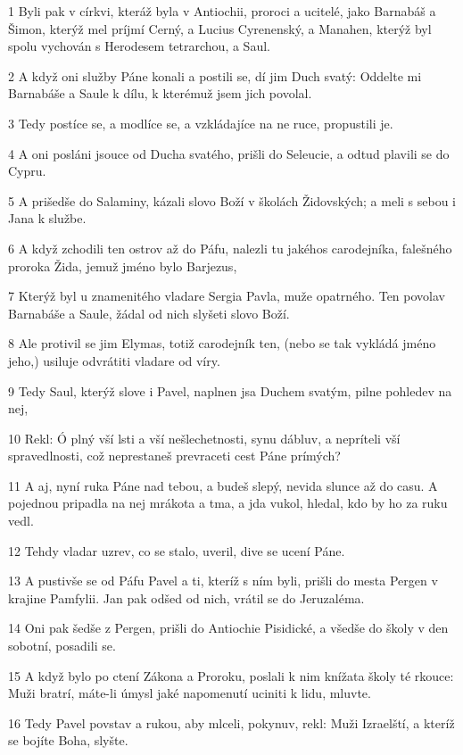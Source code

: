\par 1 Byli pak v církvi, kteráž byla v Antiochii, proroci a ucitelé, jako Barnabáš a Šimon, kterýž mel príjmí Cerný, a Lucius Cyrenenský, a Manahen, kterýž byl spolu vychován s Herodesem tetrarchou, a Saul.
\par 2 A když oni služby Páne konali a postili se, dí jim Duch svatý: Oddelte mi Barnabáše a Saule k dílu, k kterémuž jsem jich povolal.
\par 3 Tedy postíce se, a modlíce se, a vzkládajíce na ne ruce, propustili je.
\par 4 A oni posláni jsouce od Ducha svatého, prišli do Seleucie, a odtud plavili se do Cypru.
\par 5 A prišedše do Salaminy, kázali slovo Boží v školách Židovských; a meli s sebou i Jana k službe.
\par 6 A když zchodili ten ostrov až do Páfu, nalezli tu jakéhos carodejníka, falešného proroka Žida, jemuž jméno bylo Barjezus,
\par 7 Kterýž byl u znamenitého vladare Sergia Pavla, muže opatrného. Ten povolav Barnabáše a Saule, žádal od nich slyšeti slovo Boží.
\par 8 Ale protivil se jim Elymas, totiž carodejník ten, (nebo se tak vykládá jméno jeho,) usiluje odvrátiti vladare od víry.
\par 9 Tedy Saul, kterýž slove i Pavel, naplnen jsa Duchem svatým, pilne pohledev na nej,
\par 10 Rekl: Ó plný vší lsti a vší nešlechetnosti, synu dábluv, a nepríteli vší spravedlnosti, což neprestaneš prevraceti cest Páne prímých?
\par 11 A aj, nyní ruka Páne nad tebou, a budeš slepý, nevida slunce až do casu. A pojednou pripadla na nej mrákota a tma, a jda vukol, hledal, kdo by ho za ruku vedl.
\par 12 Tehdy vladar uzrev, co se stalo, uveril, dive se ucení Páne.
\par 13 A pustivše se od Páfu Pavel a ti, kteríž s ním byli, prišli do mesta Pergen v krajine Pamfylii. Jan pak odšed od nich, vrátil se do Jeruzaléma.
\par 14 Oni pak šedše z Pergen, prišli do Antiochie Pisidické, a všedše do školy v den sobotní, posadili se.
\par 15 A když bylo po ctení Zákona a Proroku, poslali k nim knížata školy té rkouce: Muži bratrí, máte-li úmysl jaké napomenutí uciniti k lidu, mluvte.
\par 16 Tedy Pavel povstav a rukou, aby mlceli, pokynuv, rekl: Muži Izraelští, a kteríž se bojíte Boha, slyšte.
